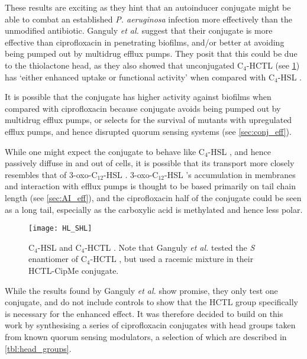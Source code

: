 These results are exciting as they hint that an autoinducer conjugate might be able to combat an established \textit{P. aeruginosa} infection more effectively than the unmodified antibiotic. 
Ganguly \textit{et al.} suggest that their conjugate is more effective than ciprofloxacin in penetrating biofilms, and/or better at avoiding being pumped out by multidrug efflux pumps. They posit that this could be due to the thiolactone head, as they also showed that unconjugated C$_4$-HCTL  (see \ref{fgr:HL_SHL}) has `either enhanced uptake or functional activity' when compared with C$_4$-HSL . 

It is possible that the conjugate  has higher activity against biofilms when compared with ciprofloxacin  because conjugate  avoids being pumped out by multidrug efflux pumps, or selects for the survival of mutants with upregulated efflux pumps, and hence disrupted quorum sensing systems (see \ref{sec:conj_eff}).

While one might expect the conjugate  to behave like C$_4$-HSL , and hence passively diffuse in and out of cells, it is possible that its transport more closely resembles that of 3-oxo-C$_{12}$-HSL . 3-oxo-C$_{12}$-HSL 's accumulation in membranes and interaction with efflux pumps is thought to be based primarily on tail chain length (see \ref{sec:AI_eff}), and the ciprofloxacin half of the conjugate  could be seen as a long tail, especially as the carboxylic acid is methylated and hence less polar.

\begin{figure}[H]
	\begin{center}
		\texttt{[image: HL\_SHL]}
		\caption{
		C$_4$-HSL  and C$_4$-HCTL . Note that Ganguly \textit{et al.} tested the \textit{S} enantiomer of C$_4$-HCTL , but used a racemic mixture in their HCTL-CipMe conjugate. %
		\label{fgr:HL_SHL}}
	\end{center}
\end{figure}

While the results found by Ganguly \textit{et al.} show promise, they only test one conjugate, and do not include controls to show that the HCTL group specifically is necessary for the enhanced effect.
It was therefore decided to build on this work by synthesising a series of ciprofloxacin conjugates with head groups taken from known quorum sensing modulators\cite{Galloway2011,Hodgkinson2012a}, a selection of which are described in \ref{tbl:head_groups}. 


